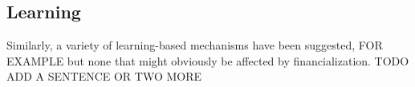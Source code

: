 \subsection{Learning}
Similarly, a variety of learning-based mechanisms have been suggested, FOR EXAMPLE but none that might obviously be affected by financialization. TODO ADD A SENTENCE OR TWO MORE









